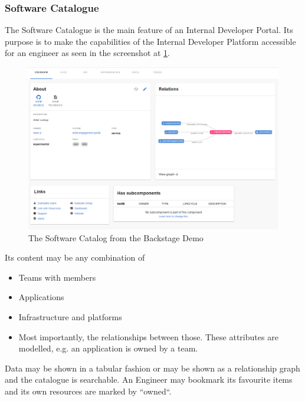 \documentclass[a4paper,12pt]{article}
\begin{document}
    \subsubsection{Software Catalogue}
    The Software Catalogue is the main feature of an Internal Developer Portal.
    Its purpose is to make the capabilities of the Internal Developer Platform accessible for an engineer as seen in the
    screenshot at \ref{fig:catalog}.

    \begin{figure}
        \includegraphics[width=\linewidth]{backstage_item_details}
        \caption{The Software Catalog from the Backstage Demo\parencite{backstagedemo}}
        \label{fig:catalog}
    \end{figure}
    Its content may be any combination of
    \begin{itemize}
        \item Teams with members
        \item Applications
        \item Infrastructure and platforms
        \item Most importantly, the relationships between those. These attributes are modelled, e.g. an application is owned by a team.
    \end{itemize}
    Data may be shown in a tabular fashion or may be shown as a relationship graph and the catalogue is searchable.
    An Engineer may bookmark its favourite items and its own resources are marked by ``owned``.
\end{document}
